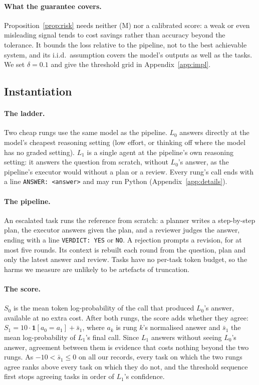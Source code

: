 \paragraph{What the guarantee covers.} Proposition~\ref{prop:risk} needs neither (M) nor a calibrated score:
a weak or even misleading signal tends to cost savings rather than accuracy beyond the tolerance. It bounds the loss
relative to the pipeline, not to the best achievable system, and its i.i.d.\ assumption covers the
model's outputs as well as the tasks. We set $\delta = 0.1$ and give the threshold grid in Appendix~\ref{app:impl}.

\subsection{Instantiation}
\label{sec:ladder}

\paragraph{The ladder.} Two cheap rungs use the same model as the pipeline. $L_0$ answers directly at
the model's cheapest reasoning setting (low effort, or thinking off where the model has no graded
setting). $L_1$ is a single agent at the pipeline's own reasoning setting: it answers the question from
scratch, without $L_0$'s answer, as the pipeline's executor would without a plan or a review.
Every rung's call ends with a line \texttt{ANSWER: <answer>} and may run Python (Appendix~\ref{app:details}).

\paragraph{The pipeline.} An escalated task runs the reference from scratch: a planner writes a
step-by-step plan, the executor answers given the plan, and a reviewer judges the answer, ending with
a line \texttt{VERDICT: YES} or \texttt{NO}. A rejection prompts a revision, for at most five rounds. Its context is rebuilt each round from the question,
plan and only the latest answer and review. Tasks have no per-task token budget, so the harms we measure
are unlikely to be artefacts of truncation.

\paragraph{The score.} $S_0$ is the mean token log-probability of the call that produced $L_0$'s answer,
available at no extra cost. After both rungs, the score adds whether they agree:
$S_1 = 10 \cdot \mathbf{1}[a_0 = a_1] + \bar s_1$, where $a_k$ is rung $k$'s normalised answer and $\bar s_1$
the mean log-probability of $L_1$'s final call. Since $L_1$ answers without seeing $L_0$'s answer, agreement
between them is evidence that costs nothing beyond the two rungs. As $-10 < \bar s_1 \le 0$ on all our records, every task on which the two rungs
agree ranks above every task on which they do not, and the threshold sequence first stops agreeing tasks
in order of $L_1$'s confidence.
